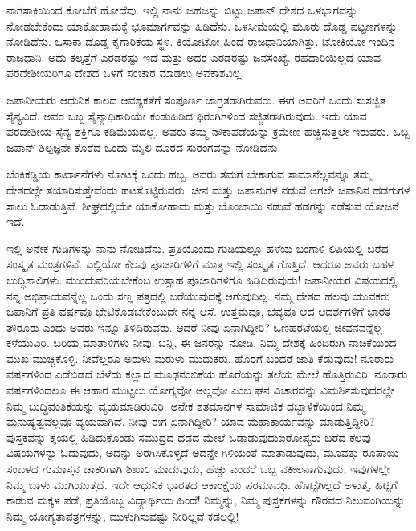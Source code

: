 ನಾಗಸಾಕಿಯಿಂದ ಕೋಬೆಗೆ ಹೋದೆವು. ಇಲ್ಲಿ ನಾನು ಜಹಜನ್ನು ಬಿಟ್ಟು ಜಪಾನ್ ದೇಶದ ಒಳಭಾಗವನ್ನು ನೋಡಬೇಕೆಂದು ಯಾಕೋಹಾಮಕ್ಕೆ ಭೂಮಾರ್ಗವನ್ನು ಹಿಡಿದೆನು. ಒಳಸೀಮೆಯಲ್ಲಿ ಮೂರು ದೊಡ್ಡ ಪಟ್ಟಣಗಳನ್ನು ನೋಡಿದೆನು. ಒಸಾಕಾ ದೊಡ್ಡ ಕೈಗಾರಿಕೆಯ ಸ್ಥಳ. ಕಿಯೋಟೋ ಹಿಂದೆ ರಾಜಧಾನಿಯಾಗಿತ್ತು. ಟೋಕಿಯೋ ಇಂದಿನ ರಾಜಧಾನಿ. ಅದು ಕಲ್ಕತ್ತೆಗೆ ಎರಡರಷ್ಟು ಇದೆ ಮತ್ತು ಅದರ ಎರಡರಷ್ಟು ಜನಸಂಖ್ಯೆ. ರಹದಾರಿಯಿಲ್ಲದೆ ಯಾವ ಪರದೇಶೀಯರಿಗೂ ದೇಶದ ಒಳಗೆ ಸಂಚಾರ ಮಾಡಲು ಅವಕಾಶವಿಲ್ಲ.

ಜಪಾನೀಯರು ಆಧುನಿಕ ಕಾಲದ ಆವಶ್ಯಕತೆಗೆ ಸಂಪೂರ್ಣ ಜಾಗ್ರತರಾಗಿರುವರು. ಈಗ ಅವರಿಗೆ ಒಂದು ಸುಸಜ್ಜಿತ ಸೈನ್ಯವಿದೆ. ಅವರ ಒಬ್ಬ ಸೈನ್ಯಾಧಿಕಾರಿಯೇ ಕಂಡುಹಿಡಿದ ಫಿರಂಗಿಗಳಿಂದ ಸಜ್ಜಿತರಾಗಿರುವುದು. ಇದು ಯಾವ ಪರದೇಶೀಯ ಸೈನ್ಯ ಶಕ್ತಿಗೂ ಕಡಿಮೆಯದಲ್ಲ. ಅವರು ತಮ್ಮ ನೌಕಾಪಡೆಯನ್ನು ಕ್ರಮೇಣ ಹೆಚ್ಚಿಸುತ್ತಲೇ ಇರುವರು. ಒಬ್ಬ ಜಪಾನ್ ಶಿಲ್ಪಜ್ಞನೇ ಕೊರೆದ ಒಂದು ಮೈಲಿ ದೂರದ ಸುರಂಗವನ್ನು ನೋಡಿದೆನು.

ಬೆಂಕಿಕಡ್ಡಿಯ ಕಾರ್ಖಾನೆಗಳು ನೋಟಕ್ಕೆ ಒಂದು ಹಬ್ಬ. ಅವರು ತಮಗೆ ಬೇಕಾಗುವ ಸಾಮಾನೆಲ್ಲವನ್ನೂ ತಮ್ಮ ದೇಶದಲ್ಲೇ ತಯಾರಿಸುತ್ತೇವೆಂದು ಹಟತೊಟ್ಟಿರುವರು. ಚೀನ ಮತ್ತು ಜಪಾನುಗಳ ನಡುವೆ ಆಗಲೇ ಜಪಾನಿನ ಹಡಗುಗಳ ಸಾಲು ಓಡಾಡುತ್ತಿವೆ. ಶೀಘ್ರದಲ್ಲಿಯೇ ಯಾಕೋಹಾಮ ಮತ್ತು ಬೊಂಬಾಯಿ ನಡುವೆ ಹಡಗನ್ನು ನಡೆಸುವ ಯೋಜನೆ ಇದೆ.

ಇಲ್ಲಿ ಅನೇಕ ಗುಡಿಗಳನ್ನು ನಾನು ನೋಡಿದೆನು. ಪ್ರತಿಯೊಂದು ಗುಡಿಯಲ್ಲೂ ಹಳೆಯ ಬಂಗಾಳಿ ಲಿಪಿಯಲ್ಲಿ ಬರೆದ ಸಂಸ್ಕೃತ ಮಂತ್ರಗಳಿವೆ. ಎಲ್ಲಿಯೋ ಕೆಲವು ಪೂಜಾರಿಗಳಿಗೆ ಮಾತ್ರ ಇಲ್ಲಿ ಸಂಸ್ಕೃತ ಗೊತ್ತಿದೆ. ಆದರೂ ಅವರು ಬಹಳ ಬುದ್ಧಿಶಾಲಿಗಳು. ಮುಂದುವರಿಯಬೇಕೆಂಬ ಉತ್ಸಾಹ ಪೂಜಾರಿಗಳಿಗೂ ಹಿಡಿದಿರುವುದು! ಜಪಾನೀಯರ ವಿಷಯದಲ್ಲಿ ನನ್ನ ಅಭಿಪ್ರಾಯವನ್ನೆಲ್ಲ ಒಂದು ಸಣ್ಣ ಪತ್ರದಲ್ಲಿ ಬರೆಯುವುದಕ್ಕೆ ಆಗುವುದಿಲ್ಲ. ನಮ್ಮ ದೇಶದ ಹಲವು ಯುವಕರು ಜಪಾನಿಗೆ ಪ್ರತಿ ವರ್ಷವೂ ಭೇಟಿಕೊಡಬೇಕೆಂಬುದೇ ನನ್ನ ಆಸೆ. ಉತ್ತಮವೂ, ಭವ್ಯವೂ ಆದ ಆದರ್ಶಗಳಿಗೆ ಭಾರತ ತೌರೂರು ಎಂದು ಅವರು ಇನ್ನೂ ತಿಳಿದಿರುವರು. ಆದರೆ ನೀವು ಏನಾಗಿದ್ದೀರಿ? ಒಣಹರಟೆಯಲ್ಲಿ ಜೀವನವನ್ನೆಲ್ಲ ಕಳೆಯುವಿರಿ. ಬರಿಯ ಮಾತಾಳಿಗಳು ನೀವು. ಬನ್ನಿ, ಈ ಜನರನ್ನು ನೋಡಿ. ನಿಮ್ಮ ದೇಶಕ್ಕೆ ಹಿಂದಿರುಗಿ ನಾಚಿಕೆಯಿಂದ ಮುಖ ಮುಚ್ಚಿಕೊಳ್ಳಿ. ನೀವೆಲ್ಲರೂ ಅರುಳು ಮರುಳು ಮುದುಕರು. ಹೊರಗೆ ಬಂದರೆ ಜಾತಿ ಕೆಡುವುದು! ನೂರಾರು ವರ್ಷಗಳಿಂದ ಎಡೆಬಿಡದೆ ಬೆಳೆದು ಕಲ್ಲಾದ ಮೂಢನಂಬಿಕೆಯ ಹೊರೆಯನ್ನು ತಲೆಯ ಮೇಲೆ ಹೊತ್ತಿರುವಿರಿ. ನೂರಾರು ವರ್ಷಗಳಿಂದಲೂ ಈ ಆಹಾರ ಮುಟ್ಟಲು ಯೋಗ್ಯವೋ ಅಲ್ಲವೋ ಎಂಬ ಘನ ವಿಚಾರವನ್ನು ವಿಮರ್ಶಿಸುವುದರಲ್ಲೇ ನಿಮ್ಮ ಬುದ್ಧಿವಂತಿಕೆಯನ್ನು ವ್ಯಯಮಾಡಿರುವಿರಿ. ಅನೇಕ ಶತಮಾನಗಳ ಸಾಮಾಜಿಕ ದಬ್ಬಾಳಿಕೆಯಿಂದ ನಿಮ್ಮ ಮನುಷ್ಯತ್ವವೆಲ್ಲವೂ ವ್ಯಯವಾಗಿದೆ. ನೀವು ಈಗ ಏನಾಗಿದ್ದೀರಿ? ಯಾವ ಮಹಾಕಾರ್ಯವನ್ನು ಮಾಡುತ್ತಿದ್ದೀರಿ? ಪುಸ್ತಕವನ್ನು ಕೈಯಲ್ಲಿ ಹಿಡಿದುಕೊಂಡು ಸಮುದ್ರದ ದಡದ ಮೇಲೆ ಓಡಾಡುವುದು\enginline{-}ಐರೋಪ್ಯರು ಬರೆದ ಕೆಲವು ವಿಷಯಗಳನ್ನು ಓದುವುದು, ಅದನ್ನು ಅರಗಿಸಿಕೊಳ್ಳದೆ ಅದನ್ನೇ ಗಿಳಿಯಂತೆ ಮಾತಾಡುವುದು, ಮೂವತ್ತು ರೂಪಾಯಿ ಸಂಬಳದ ಗುಮಾಸ್ತನ ಚಾಕರಿಗಾಗಿ ಶಿಖಾರಿ ಮಾಡುವುದು, ಹೆಚ್ಚು ಎಂದರೆ ಒಬ್ಬ ವಕೀಲನಾಗುವುದು, ಇವುಗಳಲ್ಲೇ ನಿಮ್ಮ ಬಾಳು ಮುಗಿಯುತ್ತದೆ. ಇದೇ ಆಧುನಿಕ ಭಾರತದ ಆಕಾಂಕ್ಷೆಯ ಪರಮಾವಧಿ. ಹೊಟ್ಟೆಗಿಲ್ಲದೆ ಅಳುತ್ತ, ಹಿಟ್ಟಿಗೆ ಕಾಡುವ ಮಕ್ಕಳ ಪಡೆ, ಪ್ರತಿಯೊಬ್ಬ ವಿದ್ಯಾರ್ಥಿಯ ಹಿಂದೆ! ನಿಮ್ಮನ್ನು, ನಿಮ್ಮ ಪುಸ್ತಕಗಳನ್ನು ಗೌರವದ ನಿಲುವಂಗಿಯನ್ನು  ನಿಮ್ಮ ಯೋಗ್ಯತಾಪತ್ರಗಳನ್ನು, ಮುಳುಗಿಸುವಷ್ಟು ನೀರಿಲ್ಲವೆ ಕಡಲಲ್ಲಿ!

